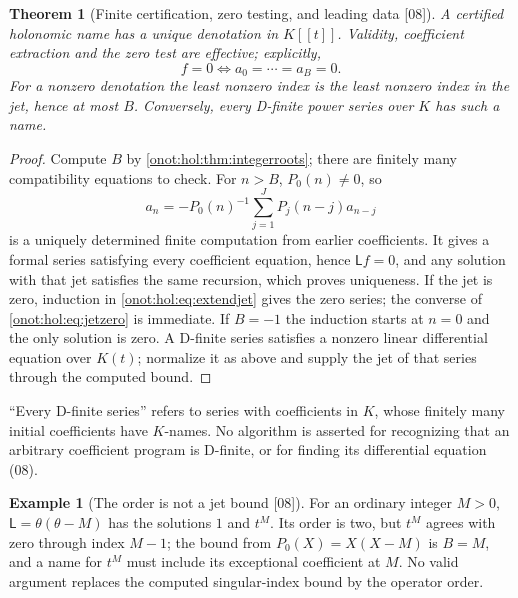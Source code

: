 \documentclass[11pt,oneside]{article}
\numberwithin{equation}{section}
\newtheorem{theorem}{Theorem}[section]
\theoremstyle{definition}
\newtheorem{example}[example]{Example}
\theoremstyle{remark}
\newcommand{\src}[1]{\textup{\textsf{\small[#1]}}}
\begin{document}
\begin{theorem}[Finite certification, zero testing, and leading data \src{08}]\label{onot:hol:thm:certificate}
A certified holonomic name has a unique denotation in $K[[t]]$. Validity,
coefficient extraction and the zero test are effective; explicitly,
\begin{equation}\label{onot:hol:eq:jetzero}
 f=0\iff a_0=\cdots=a_B=0.
\end{equation}
For a nonzero denotation the least nonzero index is the least nonzero index in
the jet, hence at most $B$. Conversely, every D-finite power series over $K$ has
such a name.
\end{theorem}
\begin{proof}
Compute $B$ by \cref{onot:hol:thm:integerroots}; there are finitely many
compatibility equations to check. For $n>B$, $P_0(n)\ne0$, so
\begin{equation}\label{onot:hol:eq:extendjet}
 a_n=-P_0(n)^{-1}\sum_{j=1}^JP_j(n-j)a_{n-j}
\end{equation}
is a uniquely determined finite computation from earlier coefficients. It gives
a formal series satisfying every coefficient equation, hence $\mathsf Lf=0$, and
any solution with that jet satisfies the same recursion, which proves
uniqueness. If the jet is zero, induction in \eqref{onot:hol:eq:extendjet} gives
the zero series; the converse of \eqref{onot:hol:eq:jetzero} is immediate. If
$B=-1$ the induction starts at $n=0$ and the only solution is zero. A D-finite
series satisfies a nonzero linear differential equation over $K(t)$; normalize
it as above and supply the jet of that series through the computed bound.
\end{proof}

``Every D-finite series'' refers to series with coefficients in $K$, whose
finitely many initial coefficients have $K$-names. No algorithm is asserted for
recognizing that an arbitrary coefficient program is D-finite, or for finding
its differential equation (08).

\begin{example}[The order is not a jet bound \src{08}]\label{onot:hol:ex:resonance}
For an ordinary integer $M>0$, $\mathsf L=\theta(\theta-M)$ has the solutions $1$
and $t^M$. Its order is two, but $t^M$ agrees with zero through index $M-1$; the
bound from $P_0(X)=X(X-M)$ is $B=M$, and a name for $t^M$ must include its
exceptional coefficient at $M$. No valid argument replaces the computed
singular-index bound by the operator order.
\end{example}
\end{document}
